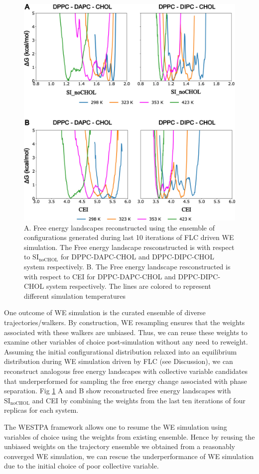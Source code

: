 \documentclass{biophys-new}
\begin{document}
\begin{figure}[hbt!]
\centering
\includegraphics[width=0.75\linewidth]{Figures/Main/6/placeholder.jpg}
\caption{A. Free energy landscapes reconstructed using the ensemble of configurations generated during last 10 iterations of FLC driven WE simulation. The Free energy landscape resconstructed is with respect to $\text{SI}_{\text{noCHOL}}$ for DPPC-DAPC-CHOL and DPPC-DIPC-CHOL system respectively. B. The Free energy landscape resconstructed is with respect to CEI for DPPC-DAPC-CHOL and DPPC-DIPC-CHOL system respectively. The lines are colored to represent different simulation temperatures}
\label{figs6:view}
\end{figure}

One outcome of WE simulation is the curated ensemble of diverse trajectories/walkers.
By construction, WE resampling ensures that the weights associated with these walkers are unbiased.
Thus, we can reuse these weights to examine other variables of choice post-simulation without any need to reweight.
Assuming the initial configurational distribution relaxed into an equilibrium distribution during WE simulation driven by FLC (see Discussion), 
we can reconstruct analogous free energy landscapes with collective variable candidates that underperformed for sampling the free energy change associated with phase separation.
Fig \ref{figs6:view} A and B show reconstructed free energy landscapes with $\text{SI}_{\text{noCHOL}}$ and CEI by combining the weights from the last ten iterations of four replicas for each system.

The WESTPA framework allows one to resume the WE simulation using variables of choice using the weights from existing ensemble\cite{Zhang2010, Zwier2015}.
Hence by reusing the unbiased weights on the trajectory ensemble we obtained from a reasonably converged WE simulation,
we can rescue the underperformance of WE simulation due to the initial choice of poor collective variable.
\end{document}
